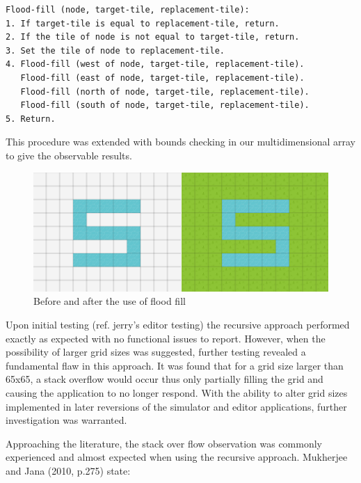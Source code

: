 \begin{minipage}{0.9\textwidth}
	\begin{lstlisting}[caption={4-way stack based recursive flood fill}, label={lst:stackFloodFill}]
Flood-fill (node, target-tile, replacement-tile):
1. If target-tile is equal to replacement-tile, return.
2. If the tile of node is not equal to target-tile, return.
3. Set the tile of node to replacement-tile.
4. Flood-fill (west of node, target-tile, replacement-tile).
   Flood-fill (east of node, target-tile, replacement-tile).
   Flood-fill (north of node, target-tile, replacement-tile).
   Flood-fill (south of node, target-tile, replacement-tile).
5. Return.
	\end{lstlisting}
\end{minipage}

This procedure was extended with bounds checking in our multidimensional array to give the observable results.

\begin{figure}[h]
	\begin{center}
		\includegraphics[scale=0.8]{img/floodFill.png}
		\caption[Flood Fill]{Before and after the use of flood fill}
		\label{fig:animthread}
	\end{center}
\end{figure}

Upon initial testing (ref. jerry's editor testing) the recursive approach performed exactly as expected with no functional issues  to report.  However, when the possibility of larger grid sizes was suggested, further testing revealed a fundamental flaw in this approach.  It was found that for a grid size larger than 65x65, a stack overflow would occur thus only partially filling the grid and causing the application to no longer respond.  With the ability to alter grid sizes implemented in later reversions of the simulator and editor applications, further investigation was warranted.

Approaching the literature, the stack over flow observation was commonly experienced and almost expected when using the recursive approach.  Mukherjee and Jana (2010, p.275) state:


